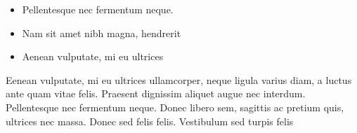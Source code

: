 \documentclass{comjnl}
\begin{document}
\begin{itemize}
    \item Pellentesque nec fermentum neque.
    \item Nam sit amet nibh magna, hendrerit
    \item Aenean vulputate, mi eu ultrices
\end{itemize}
Eenean vulputate, mi eu ultrices ullamcorper, neque ligula varius diam, a luctus ante quam vitae felis. Praesent dignissim aliquet augue nec interdum. Pellentesque nec fermentum neque. Donec libero sem, sagittis ac pretium quis, ultrices nec massa. Donec sed felis felis. Vestibulum sed turpis felis 







\end{document}
